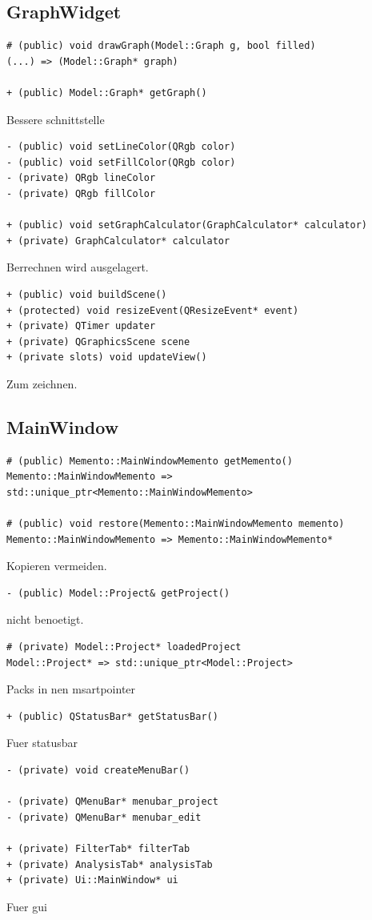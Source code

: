 \documentclass[parskip=full]{scrartcl}
\begin{document}
\subsection{GraphWidget}
\begin{verbatim}
# (public) void drawGraph(Model::Graph g, bool filled)
(...) => (Model::Graph* graph)

+ (public) Model::Graph* getGraph()
\end{verbatim}
Bessere schnittstelle
\begin{verbatim}
- (public) void setLineColor(QRgb color)
- (public) void setFillColor(QRgb color)
- (private) QRgb lineColor
- (private) QRgb fillColor

+ (public) void setGraphCalculator(GraphCalculator* calculator)
+ (private) GraphCalculator* calculator
\end{verbatim}
Berrechnen wird ausgelagert.
\begin{verbatim}
+ (public) void buildScene()
+ (protected) void resizeEvent(QResizeEvent* event)
+ (private) QTimer updater
+ (private) QGraphicsScene scene
+ (private slots) void updateView()
\end{verbatim}
Zum zeichnen.
\subsection{MainWindow}
\begin{verbatim}
# (public) Memento::MainWindowMemento getMemento()
Memento::MainWindowMemento => std::unique_ptr<Memento::MainWindowMemento>

# (public) void restore(Memento::MainWindowMemento memento)
Memento::MainWindowMemento => Memento::MainWindowMemento*
\end{verbatim}
Kopieren vermeiden.
\begin{verbatim}
- (public) Model::Project& getProject()
\end{verbatim}
nicht benoetigt.
\begin{verbatim}
# (private) Model::Project* loadedProject
Model::Project* => std::unique_ptr<Model::Project>
\end{verbatim}
Packs in nen msartpointer
\begin{verbatim}
+ (public) QStatusBar* getStatusBar()
\end{verbatim}
Fuer statusbar
\begin{verbatim}
- (private) void createMenuBar()

- (private) QMenuBar* menubar_project
- (private) QMenuBar* menubar_edit

+ (private) FilterTab* filterTab
+ (private) AnalysisTab* analysisTab
+ (private) Ui::MainWindow* ui
\end{verbatim}
Fuer gui
\end{document}
